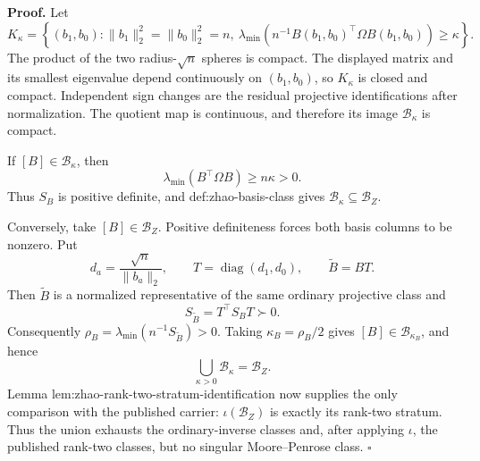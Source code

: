 \textbf{Proof.}
Let
\[
 K_\kappa=\left\{(b_1,b_0):
 \lVert b_1\rVert_2^2=\lVert b_0\rVert_2^2=n,
 \ \lambda_{\min}\!\left(n^{-1}B(b_1,b_0)^{\top}\Omega B(b_1,b_0)\right)\ge\kappa
 \right\}.
\]
The product of the two radius-\(\sqrt n\) spheres is compact.  The displayed matrix and its smallest eigenvalue depend continuously on \((b_1,b_0)\), so \(K_\kappa\) is closed and compact.  Independent sign changes are the residual projective identifications after normalization.  The quotient map is continuous, and therefore its image \(\mathcal B_\kappa\) is compact.

If \([B]\in\mathcal B_\kappa\), then
\[
 \lambda_{\min}(B^{\top}\Omega B)\ge n\kappa>0.
\]
Thus \(S_B\) is positive definite, and def:zhao-basis-class gives \(\mathcal B_\kappa\subseteq\mathcal B_Z\).

Conversely, take \([B]\in\mathcal B_Z\).  Positive definiteness forces both basis columns to be nonzero.  Put
\[
 d_a=\frac{\sqrt n}{\lVert b_a\rVert_2},
 \qquad T=\operatorname{diag}(d_1,d_0),
 \qquad \widetilde B=BT.
\]
Then \(\widetilde B\) is a normalized representative of the same ordinary projective class and
\[
 S_{\widetilde B}=T^{\top}S_BT\succ0.
\]
Consequently \(\rho_B=\lambda_{\min}(n^{-1}S_{\widetilde B})>0\).  Taking \(\kappa_B=\rho_B/2\) gives \([B]\in\mathcal B_{\kappa_B}\), and hence
\[
 \bigcup_{\kappa>0}\mathcal B_\kappa=\mathcal B_Z.
\]
Lemma lem:zhao-rank-two-stratum-identification now supplies the only comparison with the published carrier: \(\iota(\mathcal B_Z)\) is exactly its rank-two stratum.  Thus the union exhausts the ordinary-inverse classes and, after applying \(\iota\), the published rank-two classes, but no singular Moore--Penrose class. \(\square\)
